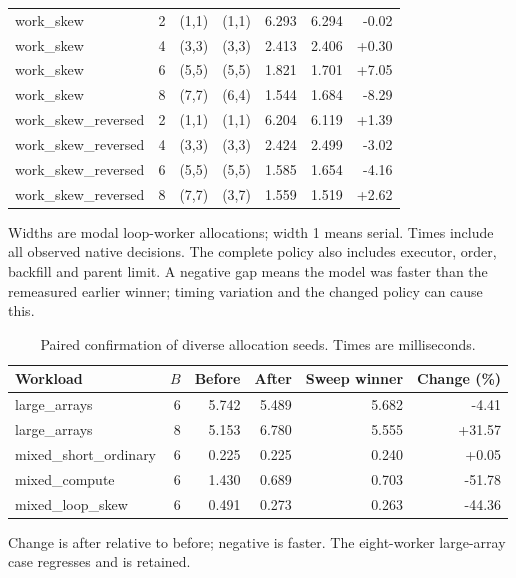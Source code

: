 \begin{center}
\begin{longtable}{lrrrrrr}
work\_skew & 2 & (1,1) & (1,1) & 6.293 & 6.294 & -0.02 \\
work\_skew & 4 & (3,3) & (3,3) & 2.413 & 2.406 & +0.30 \\
work\_skew & 6 & (5,5) & (5,5) & 1.821 & 1.701 & +7.05 \\
work\_skew & 8 & (7,7) & (6,4) & 1.544 & 1.684 & -8.29 \\
work\_skew\_reversed & 2 & (1,1) & (1,1) & 6.204 & 6.119 & +1.39 \\
work\_skew\_reversed & 4 & (3,3) & (3,3) & 2.424 & 2.499 & -3.02 \\
work\_skew\_reversed & 6 & (5,5) & (5,5) & 1.585 & 1.654 & -4.16 \\
work\_skew\_reversed & 8 & (7,7) & (3,7) & 1.559 & 1.519 & +2.62 \\
\bottomrule
\end{longtable}
\par\medskip\begin{minipage}{0.98\linewidth}\footnotesize Widths are modal loop-worker allocations; width 1 means serial. Times include all observed native decisions. The complete policy also includes executor, order, backfill and parent limit. A negative gap means the model was faster than the remeasured earlier winner; timing variation and the changed policy can cause this.\end{minipage}
\end{center}
\begin{table}[htbp]\centering
\small
\begin{tabular}{lrrrrr}
\toprule
Workload & $B$ & Before & After & Sweep winner & Change (\%) \\
\midrule
large\_arrays & 6 & 5.742 & 5.489 & 5.682 & -4.41 \\
large\_arrays & 8 & 5.153 & 6.780 & 5.555 & +31.57 \\
mixed\_short\_ordinary & 6 & 0.225 & 0.225 & 0.240 & +0.05 \\
mixed\_compute & 6 & 1.430 & 0.689 & 0.703 & -51.78 \\
mixed\_loop\_skew & 6 & 0.491 & 0.273 & 0.263 & -44.36 \\
\bottomrule
\end{tabular}
\caption{Paired confirmation of diverse allocation seeds. Times are milliseconds.}\label{tab:utb-diverse-confirmation}
\par\medskip\begin{minipage}{0.98\linewidth}\footnotesize Change is after relative to before; negative is faster. The eight-worker large-array case regresses and is retained.\end{minipage}
\end{table}
